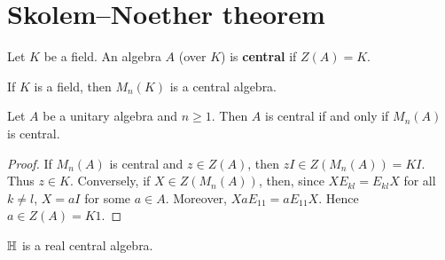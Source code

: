     


	


\section{Skolem--Noether theorem}

\begin{definition}
    Let $K$ be a field. 
	An algebra $A$ (over $K$) is \textbf{central} if $Z(A)=K$. 
\end{definition}

If $K$ is a field, then $M_n(K)$ is a central algebra.

\begin{proposition}
	Let $A$ be a unitary algebra and $n\geq1$. Then
	$A$ is central if and only if $M_n(A)$ is central.
\end{proposition}

\begin{proof}
	If $M_n(A)$ is central and $z\in Z(A)$, then
	$zI\in Z(M_n(A))=KI$. Thus
	$z\in K$. Conversely, if $X\in Z(M_n(A))$, then, since 
	$XE_{kl}=E_{kl}X$ for all $k\ne l$, $X=aI$ for some $a\in A$. 
	Moreover, 
	$XaE_{11}=aE_{11}X$. Hence $a\in Z(A)=K1$. 
\end{proof}

\begin{example}
	$\mathbb{H}$ is a real central algebra.
\end{example}

